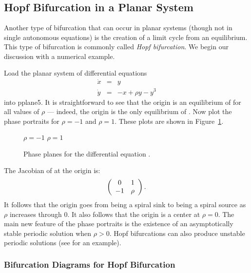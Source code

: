 \subsection*{Hopf Bifurcation in a Planar System} 

Another type of bifurcation that can occur in planar systems (though not in
single autonomous equations) is the creation of a limit cycle from an
equilibrium.  This type of bifurcation is commonly called {\em Hopf 
bifurcation\/}.  We begin our discussion with a numerical example.  

Load the planar system of differential equations 
\begin{equation*} \label{E:Hopfbif}
\begin{array}{rcl}
\dot{x} & = & y \\
\dot{y} & = & -x + \rho y - y^3  \end{array}
\end{equation*}
into {\sf pplane5}.
It is straightforward to see that the origin is an equilibrium of 
 for all values of $\rho$ --- indeed, the origin is 
the only equilibrium of .  Now plot the phase 
portraits for $\rho=-1$ and $\rho=1$.  These plots are shown in 
Figure~\ref{F:Hopfbif}.  

\begin{figure}[htb]
           \centerline{%
           }
		\vspace*{-0.2in}		
		\qquad\qquad\qquad $\rho=-1$ \hspace{2.8in} $\rho=1$
	   \caption{Phase planes for the differential equation 
      \protect{}.}
           \label{F:Hopfbif}
\end{figure}


The Jacobian of  at the origin is:
\[
\left(\begin{array}{cc} 0 & 1\\ -1 &\rho\end{array}\right).
\]
It follows that the origin goes from being a 
spiral sink to being a 
spiral source 
as $\rho$ increases through $0$.  It also follows that  
the origin is a center at $\rho=0$.  
The main new feature of the phase portraits is the 
existence of an asymptotically stable 
periodic solution when $\rho>0$.  
Hopf bifurcations can also produce unstable periodic solutions
 (see  for an example).   

\subsubsection*{Bifurcation Diagrams for Hopf Bifurcation}

